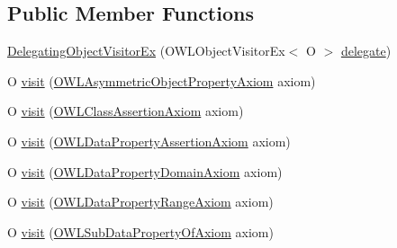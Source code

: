 \subsection*{Public Member Functions}
\begin{DoxyCompactItemize}
\item 
\hyperlink{classorg_1_1semanticweb_1_1owlapi_1_1util_1_1_delegating_object_visitor_ex_3_01_o_01_4_a0b9d14fae0c7d1cb7018e2ce8d9179a1}{Delegating\-Object\-Visitor\-Ex} (O\-W\-L\-Object\-Visitor\-Ex$<$ O $>$ \hyperlink{classorg_1_1semanticweb_1_1owlapi_1_1util_1_1_delegating_object_visitor_ex_3_01_o_01_4_a5d357422bfba7c8d47fd65eb2b96f076}{delegate})
\item 
O \hyperlink{classorg_1_1semanticweb_1_1owlapi_1_1util_1_1_delegating_object_visitor_ex_3_01_o_01_4_ae3a371915b0f15aa7f38b681d0fce4b2}{visit} (\hyperlink{interfaceorg_1_1semanticweb_1_1owlapi_1_1model_1_1_o_w_l_asymmetric_object_property_axiom}{O\-W\-L\-Asymmetric\-Object\-Property\-Axiom} axiom)
\item 
O \hyperlink{classorg_1_1semanticweb_1_1owlapi_1_1util_1_1_delegating_object_visitor_ex_3_01_o_01_4_a3e15addad24d3f7abf1a65c722e92afc}{visit} (\hyperlink{interfaceorg_1_1semanticweb_1_1owlapi_1_1model_1_1_o_w_l_class_assertion_axiom}{O\-W\-L\-Class\-Assertion\-Axiom} axiom)
\item 
O \hyperlink{classorg_1_1semanticweb_1_1owlapi_1_1util_1_1_delegating_object_visitor_ex_3_01_o_01_4_a99155bbae053fa9552442036123cb255}{visit} (\hyperlink{interfaceorg_1_1semanticweb_1_1owlapi_1_1model_1_1_o_w_l_data_property_assertion_axiom}{O\-W\-L\-Data\-Property\-Assertion\-Axiom} axiom)
\item 
O \hyperlink{classorg_1_1semanticweb_1_1owlapi_1_1util_1_1_delegating_object_visitor_ex_3_01_o_01_4_a0be3ca3fe0e89de7eff422b2a0bcd03d}{visit} (\hyperlink{interfaceorg_1_1semanticweb_1_1owlapi_1_1model_1_1_o_w_l_data_property_domain_axiom}{O\-W\-L\-Data\-Property\-Domain\-Axiom} axiom)
\item 
O \hyperlink{classorg_1_1semanticweb_1_1owlapi_1_1util_1_1_delegating_object_visitor_ex_3_01_o_01_4_addb7ca0d12bb037f881f0c3d59a8ca4c}{visit} (\hyperlink{interfaceorg_1_1semanticweb_1_1owlapi_1_1model_1_1_o_w_l_data_property_range_axiom}{O\-W\-L\-Data\-Property\-Range\-Axiom} axiom)
\item 
O \hyperlink{classorg_1_1semanticweb_1_1owlapi_1_1util_1_1_delegating_object_visitor_ex_3_01_o_01_4_aa2b2e02484179703bad5afbe2768c198}{visit} (\hyperlink{interfaceorg_1_1semanticweb_1_1owlapi_1_1model_1_1_o_w_l_sub_data_property_of_axiom}{O\-W\-L\-Sub\-Data\-Property\-Of\-Axiom} axiom)

\end{DoxyCompactItemize}
